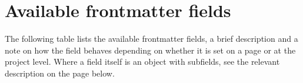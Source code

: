 \documentclass[letterpaper,12pt,english]{sphinxmanual}
\begin{document}
\begin{sphinxVerbatim}[commandchars=\\\{\}]
\end{sphinxVerbatim}


\section{Available frontmatter fields}
\label{\detokenize{notebooks/02-myst.integration:available-frontmatter-fields}}
\sphinxAtStartPar
The following table lists the available frontmatter fields, a brief description and a note on how the field behaves depending on whether it is set on a page or at the project level. Where a field itself is an object with sub\sphinxhyphen{}fields, see the relevant description on the page below.
\end{document}
